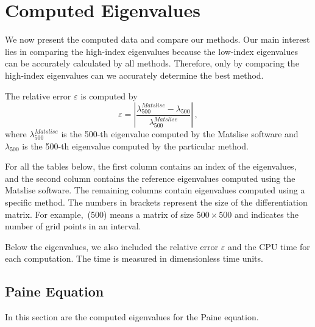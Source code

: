 \documentclass[11pt,a4paper,oneside,openright]{report} %
\begin{document}
\section{Computed Eigenvalues}
\noindent
We now present the computed data and compare our methods. Our main interest lies in comparing the high-index eigenvalues because the low-index eigenvalues can be accurately calculated by all methods. Therefore, only by comparing the high-index eigenvalues can we accurately determine the best method.

The relative error $\varepsilon$ is computed by
\begin{equation}
    \varepsilon = \left| \frac{\lambda_{500}^{Matslise} - \lambda_{500}}{\lambda_{500}^{Matslise}} \right| \, ,
\end{equation}
where $\lambda_{500}^{Matslise}$ is the 500-th eigenvalue computed by the Matslise software and $\lambda_{500}$ is the 500-th eigenvalue computed by the particular method.

For all the tables below, the first column contains an index of the eigenvalues, and the second column contains the reference eigenvalues computed using the Matslise software. The remaining columns contain eigenvalues computed using a specific method. The numbers in brackets represent the size of the differentiation matrix. For example,~(500) means a matrix of size $500 \times 500$ and indicates the number of grid points in an interval.

Below the eigenvalues, we also included the relative error $\varepsilon$ and the CPU time for each computation. The time is measured in dimensionless time units.

\subsection{Paine Equation}
\noindent
In this section are the computed eigenvalues for the Paine equation. 
\end{document}
